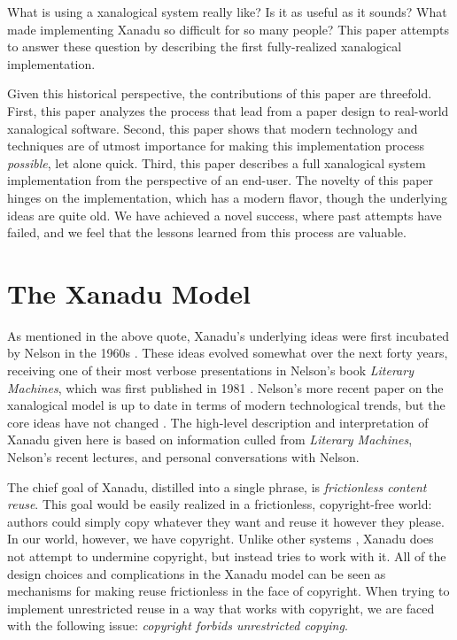 \documentclass{acm_proc_article-sp}
\begin{document}
What is using a xanalogical system really like?
Is it as useful as it sounds?
What made implementing Xanadu so difficult for so many people?  
This paper attempts to answer these question by describing the first fully-realized xanalogical implementation.

Given this historical perspective, the contributions of this paper are threefold.
First, this paper analyzes the process that lead from a paper design to real-world xanalogical software.
Second, this paper shows that modern technology and techniques are of utmost importance for making this implementation process {\it possible}, let alone quick.
Third, this paper describes a full xanalogical system implementation from the perspective of an end-user.
The novelty of this paper hinges on the implementation, which has a modern flavor, though the underlying ideas are quite old.
We have achieved a novel success, where past attempts have failed, and we feel that the lessons learned from this process are valuable.




\section{The Xanadu Model}

\label{sec:Xanadu}
As mentioned in the above quote, Xanadu's underlying ideas were first incubated by Nelson in the 1960s \cite{Nelson1965}.  
These ideas evolved somewhat over the next forty years, receiving one of their most verbose presentations in Nelson's book {\it Literary Machines}, which was first published in 1981 \cite{NelsonLiteraryMachines}.  
Nelson's more recent paper on the xanalogical model is up to date in terms of modern technological trends, but the core ideas have not changed \cite{Nelson1999}.  
The high-level description and interpretation of Xanadu given here is based on information culled from {\it Literary Machines}, Nelson's recent lectures, and personal conversations with Nelson.

The chief goal of Xanadu, distilled into a single phrase, is {\it frictionless content reuse}.  
This goal would be easily realized in a frictionless, copyright-free world:  authors could simply copy whatever they want and reuse it however they please.  
In our world, however, we have copyright.
Unlike other systems \cite{Clark2000}, Xanadu does not attempt to undermine copyright, but instead tries to work with it. 
All of the design choices and complications in the Xanadu model can be seen as mechanisms for making reuse frictionless in the face of copyright.
When trying to implement unrestricted reuse in a way that works with copyright, we are faced with the following issue:  {\it copyright forbids unrestricted copying}.
\end{document}
